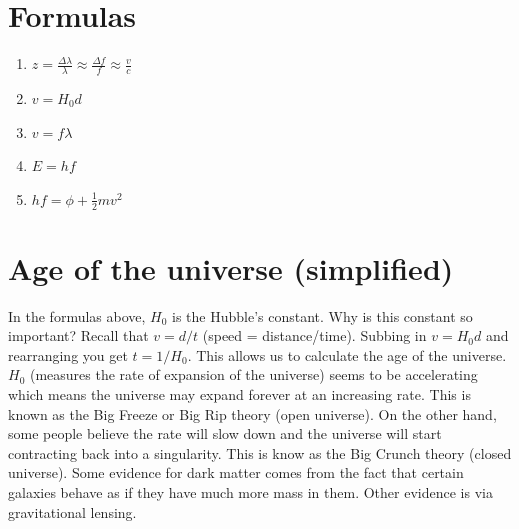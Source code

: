 \documentclass[12pt]{article}
\begin{document}
    \section*{Formulas}
    \begin{enumerate}
        \item $z = \frac{\Delta \lambda}{\lambda} \approx \frac{\Delta f}{f} \approx \frac{v}{c}$
        \item $v=H_{0}d$
        \item $v = f\lambda$
        \item $E=hf$
        \item $hf = \phi + \frac{1}{2}mv^2$
    \end{enumerate}


    \section*{Age of the universe (simplified)}
    In the formulas above, $H_{0}$ is the Hubble's constant. Why is this constant so important? Recall that $v=d/t$ (speed = distance/time).
    Subbing in $v = H_{0}d$ and rearranging you get $t=1/H_{0}$. This allows us to calculate the age of the universe. \newline
    $H_{0}$ (measures the rate of expansion of the universe) seems to be accelerating which means the universe may expand 
    forever at an increasing rate. This is known as the Big Freeze or Big Rip theory (open universe). On the other hand, some people believe the rate will
    slow down and the universe will start contracting back into a singularity. This is know as the Big Crunch theory (closed universe). \newline
    Some evidence for dark matter comes from the fact that certain galaxies behave as if they have much more mass in them. Other evidence
    is via gravitational lensing.
\end{document}

